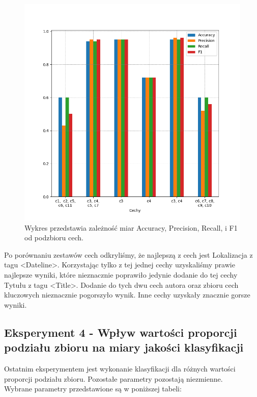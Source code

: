 \documentclass{classrep}
\begin{document}
\begin{figure}[h!]
 \centering
 \includegraphics[width=15cm]{wykres_cechy.png}
 \vspace{-0.3cm}
 \caption{Wykres przedstawia zależność miar Accuracy, Precision, Recall, i F1 od podzbioru cech.}
 \label{wykres3}
\end{figure}

\newpage

Po porównaniu zestawów cech odkryliśmy, że najlepszą z cech jest Lokalizacja z tagu \textless Dateline\textgreater. Korzystając tylko z tej jednej cechy uzyskaliśmy prawie najlepsze wyniki, które nieznacznie poprawiło jedynie dodanie do tej cechy Tytułu z tagu \textless Title\textgreater. Dodanie do tych dwu cech autora oraz zbioru cech kluczowych nieznacznie pogorszyło wynik. Inne cechy uzyskały znacznie gorsze wyniki.  \\


\subsection{Eksperyment 4 - Wpływ wartości proporcji podziału zbioru na miary jakości klasyfikacji}
Ostatnim eksperymentem jest wykonanie klasyfikacji dla różnych wartości proporcji podziału zbioru. Pozostałe parametry pozostają niezmienne.\\ 
Wybrane parametry przedstawione są w poniższej tabeli:
 
\end{document}

